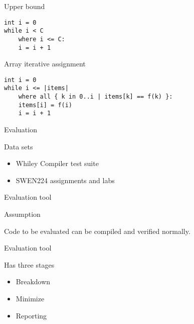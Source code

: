 \documentclass[ignorenonframetext,]{beamer}
\providecommand{\tightlist}{%
  \setlength{\itemsep}{0pt}\setlength{\parskip}{0pt}}
\begin{document}
\begin{frame}[fragile]{Upper bound}

\begin{verbatim}
int i = 0
while i < C
    where i <= C:
    i = i + 1
\end{verbatim}

\end{frame}

\begin{frame}[fragile]{Array iterative assignment}

\begin{verbatim}
int i = 0
while i <= |items|
    where all { k in 0..i | items[k] == f(k) }:
    items[i] = f(i)
    i = i + 1
\end{verbatim}

\end{frame}

\begin{frame}{Evaluation}

\begin{block}{Data sets}

\begin{itemize}
\item
  Whiley Compiler test suite
\item
  SWEN224 assignments and labs
\end{itemize}

\end{block}

\end{frame}

\begin{frame}{Evaluation tool}

\begin{block}{Assumption}

Code to be evaluated can be compiled and verified normally.

\end{block}

\end{frame}

\begin{frame}{Evaluation tool}

Has three stages

\begin{itemize}
\tightlist
\item
  Breakdown
\item
  Minimize
\item
  Reporting
\end{itemize}

\end{frame}
\end{document}

